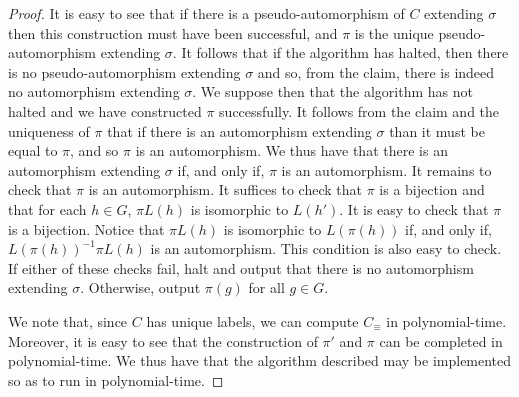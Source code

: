 \documentclass[../paper.tex]{subfiles}
\begin{document}
\begin{proof}
It is easy to see that if there is a pseudo-automorphism of $C$ extending
$\sigma$ then this construction must have been successful, and $\pi$ is the
unique pseudo-automorphism extending $\sigma$. It follows that if the algorithm
has halted, then there is no pseudo-automorphism extending $\sigma$ and so, from
the claim, there is indeed no automorphism extending $\sigma$. We suppose then
that the algorithm has not halted and we have constructed $\pi$ successfully. It
follows from the claim and the uniqueness of $\pi$ that if there is an
automorphism extending $\sigma$ than it must be equal to $\pi$, and so $\pi$ is
an automorphism. We thus have that there is an automorphism extending $\sigma$
if, and only if, $\pi$ is an automorphism. It remains to check that $\pi$ is an
automorphism. It suffices to check that $\pi$ is a bijection and that for each
$h \in G$, $\pi L(h)$ is isomorphic to $L(h')$. It is easy to check that $\pi$
is a bijection. Notice that $\pi L(h)$ is isomorphic to $L(\pi(h))$ if, and only
if, $L(\pi(h))^{-1}\pi L(h)$ is an automorphism. This condition is also easy to
check. If either of these checks fail, halt and output that there is no
automorphism extending $\sigma$. Otherwise, output $\pi (g)$ for all $g \in G$.

We note that, since $C$ has unique labels, we can compute $C_\equiv$ in
polynomial-time. Moreover, it is easy to see that the construction of $\pi'$ and
$\pi$ can be completed in polynomial-time. We thus have that the algorithm
described may be implemented so as to run in polynomial-time.
\end{proof}


\end{document}
